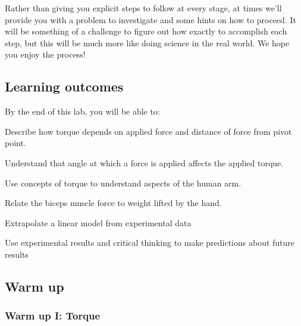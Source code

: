Rather than giving you explicit steps to follow at every stage,
at times we'll provide you with a problem to investigate
and some hints on how to proceed.  
It will be something of a challenge to figure out how exactly to accomplish
each step, but this will be much more like doing science in the real world.
We hope you enjoy the process!

\subsection*{Learning outcomes}
By the end of this lab, you will be able to:
\enumb[label=\roman*.]
\item Describe how torque depends on applied force and distance 
of force from pivot point.
\item Understand that angle at which a force is applied 
	affects the applied torque.
\item Use concepts of torque to understand aspects of the human arm.
\item Relate the biceps muscle force to weight lifted by the hand.
\item Extrapolate a linear model from experimental data
\item Use experimental results and critical thinking
	to make predictions about future results
\enume

\pagebreak

\subsection*{Warm up}

\subsubsection*{Warm up I:  Torque}


